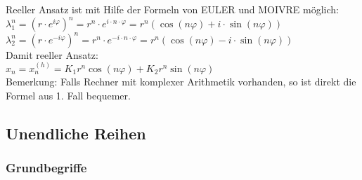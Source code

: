 Reeller Ansatz ist mit Hilfe der Formeln von EULER und MOIVRE möglich:\\
$\lambda_1^n= \left(r\cdot e^{i\varphi}\right)^n = r^n \cdot e^{i\cdot n \cdot \varphi} = r^n(\cos(n\varphi)+i\cdot \sin(n\varphi))$\\
$\lambda_2^n= \left(r\cdot e^{-i\varphi}\right)^n = r^n \cdot e^{-i\cdot n \cdot \varphi} = r^n(\cos(n\varphi)-i\cdot \sin(n\varphi))$\\
Damit reeller Ansatz:\\
$x_n=x_n^{(h)}=K_1 r^n \cos(n\varphi)+K_2 r^n \sin(n \varphi)$\\
Bemerkung: Falls Rechner mit komplexer Arithmetik vorhanden, so ist direkt die Formel aus 1. Fall bequemer.

\subsection{Unendliche Reihen}
\subsubsection{Grundbegriffe}
